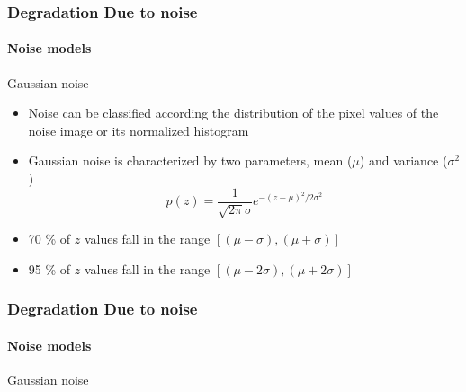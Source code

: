 \documentclass{beamer}
\begin{document}
\begin{frame}	
\frametitle{Degradation Due to noise}
\framesubtitle{Noise models}
\begin{block}{Gaussian noise}
\begin{itemize}
	\item Noise can be classified according the distribution of the pixel values of the noise image or its normalized histogram
	\item Gaussian noise is characterized by two parameters, mean ($\mu$) and variance ($\sigma^2$)
	$$ p(z) = \frac{1}{\sqrt{2\pi}\sigma}e^{-(z-\mu)^2/2\sigma^2}$$
	\item 70 \% of $z$ values fall in the range $[(\mu-\sigma), (\mu+\sigma)]$
	\item 95 \% of $z$ values fall in the range $[(\mu-2\sigma), (\mu+2\sigma)]$
\end{itemize}		
\end{block}
\end{frame}
\begin{frame}	
\frametitle{Degradation Due to noise}
\framesubtitle{Noise models}
\begin{block}{Gaussian noise}
\end{block}
\end{frame}
\end{document}
